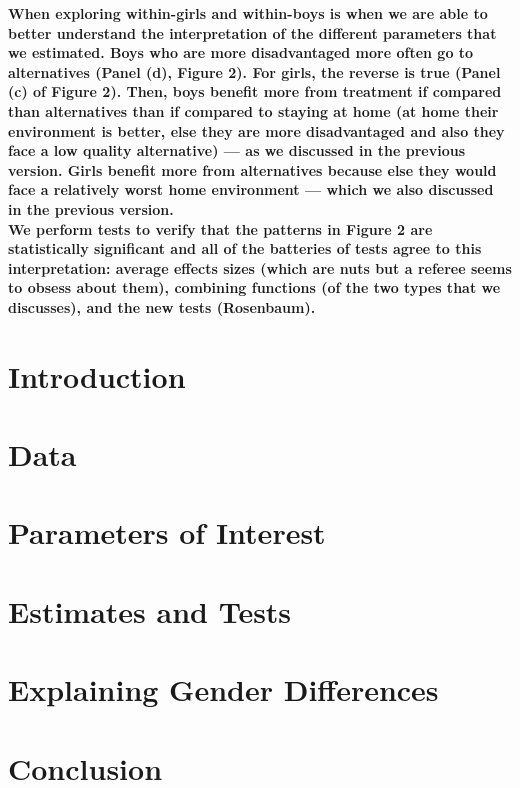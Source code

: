 \noindent \textbf{When exploring within-girls and within-boys is when we are able to better understand the interpretation of the different parameters that we estimated. Boys who are more disadvantaged more often go to alternatives (Panel (d), Figure 2). For girls, the reverse is true (Panel (c) of Figure 2). Then, boys benefit more from treatment if compared than alternatives than if compared to staying at home (at home their environment is better, else they are more disadvantaged and also they face a low quality alternative) --- as we discussed in the previous version. Girls benefit more from alternatives because else they would face a relatively worst home environment --- which we also discussed in the previous version.} \\

\noindent \textbf{We perform tests to verify that the patterns in Figure 2 are statistically significant and all of the batteries of tests agree to this interpretation: average effects sizes (which are nuts but a referee seems to obsess about them), combining functions (of the two types that we discusses), and the new tests (Rosenbaum).}
\vspace{3 em}

\clearpage

\restoregeometry
\doublespacing


\setcounter{page}{0}

\setlength\parindent{0pt}
\setlength{\parskip}{10pt}

\section{Introduction}
\label{sec:introduction}
	

\section{Data}
\label{sec:data}


\section{Parameters of Interest}
\label{sec:parameters}


\section{Estimates and Tests}
\label{sec:treatment-effects}


\section{Explaining Gender Differences}
\label{sec:gender-differences}


\section{Conclusion}
\label{sec:conclusion}


\singlespacing




